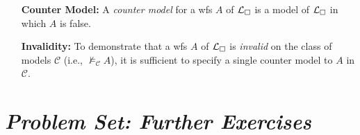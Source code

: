 \documentclass[a4paper, 11pt]{article} %
\begin{document}
\begin{enumerate}[leftmargin=1.2in,labelsep=.15in]
\begin{enumerate}
	\item[$(S4)$] The system $S4$ is sound and complete over the reflexive and transitive models $\mathcal{C}_{S4}=\mathcal{C}_r\bigcap\mathcal{C}_t$, i.e., $\vdash_{S4} A$ if and only if $\vDash_{\mathcal{C}_{S4}} A$.\footnote{The intersection $X\bigcap Y$ is the set of elements in both $X$ and $Y$, i.e., $X\bigcap Y=\set{z:z\in X ~\text{and}~ z\in Y}$.}
	\item[$(S5)$] The modal system $S5$ is sound and complete over the class of all reflexive, symmetric, and transitive models $\mathcal{C}_{S5}=\mathcal{C}_r\bigcap\mathcal{C}_s\bigcap\mathcal{C}_t$, i.e., $\vdash_{S5} A$ if and only if $\vDash_{\mathcal{C}_{S5}} A$.\footnote{See \citet{Hughes1996} for proofs of soundness and completeness for $K,T,S4$, and $S5$.}
	\end{enumerate}
\item[\bf Counter Model:] A \textit{counter model} for a wfs $A$ of $\mathcal{L}_\square$ is a model of $\mathcal{L}_\square$ in which $A$ is false.
\item[\bf Invalidity:] To demonstrate that a wfs $A$ of $\mathcal{L}_\square$ is \textit{invalid} on the class of models $\mathcal{C}$ (i.e., $\nvDash_\mathcal{C} A$), it is sufficient to specify a single counter model to $A$ in $\mathcal{C}$.
\end{enumerate}




\section*{\it Problem Set: Further Exercises}
\end{document}
